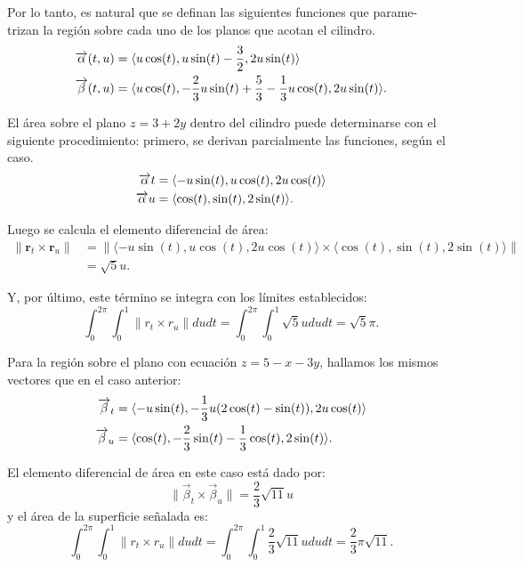 Por lo tanto, es natural que se definan las siguientes funciones que parame- \\ trizan la región sobre cada uno de los planos que acotan el cilindro.
\begin{align*}
\overrightarrow{\alpha }(t,u)&= \langle u\cos (t),u\sin (t)-\frac{3}{2},2u\sin (t)\rangle \\
\overrightarrow{\beta }(t,u)&= \langle u\cos (t),-\frac{2}{3}u\sin (t)+\frac{5}{3}-\frac{1}{3}u\cos (t),2u\sin (t)\rangle.
\end{align*}

El área sobre el plano $z=3+2y$ dentro del cilindro puede determinarse con el siguiente procedimiento: primero, se derivan parcialmente las funciones, según el caso.
\begin{align*}
\overrightarrow{\alpha }{t}&= \langle -u\sin (t),u\cos (t),2u\cos (t)\rangle  \\
\overrightarrow{\alpha }{u}&= \langle \cos (t),\sin (t),2\sin (t)\rangle.
\end{align*}

Luego se calcula el elemento diferencial de área:
\begin{align*}
\|\mathbf{r}_t \times \mathbf{r}_u\| &= \| \langle -u\sin(t), u\cos(t), 2u\cos(t) \rangle \times \langle \cos(t), \sin(t), 2\sin(t) \rangle \| \\
&= \sqrt{5}u.
\end{align*}

Y, por último, este término se integra con los límites establecidos:
\[\int_{0}^{2\pi }\int_{0}^{1}\| r_{t}\times r_{u}\|
dudt=\int_{0}^{2\pi }\int_{0}^{1}\sqrt{5}ududt= \sqrt{5}\pi.\]

Para la región sobre el plano con ecuación $z=5-x-3y$,
hallamos los mismos vectores que en el caso anterior:
\begin{align*}
\overrightarrow{\beta}_{t}&=  \langle -u\sin (t),-\frac{1}{3}u( 2\cos (t)-\sin (t))  ,2u\cos (t) \rangle  \\
\overrightarrow{\beta}_{u}&= \langle \cos (t),-\frac{2}{3}\sin (t)-\frac{1}{3}\cos (t),2\sin (t)\rangle.
\end{align*}

El elemento diferencial de área en este caso está dado por:
\[\| \overrightarrow{\beta}_{t} \times \overrightarrow{\beta}_{u} \|= \frac{2}{3}\sqrt{11}u\]
y el área de la superficie señalada es:
\[\int_{0}^{2\pi }\int_{0}^{1}\| r_{t}\times r_{u}\|
dudt=\int_{0}^{2\pi }\int_{0}^{1}\frac{2}{3}\sqrt{11}ududt= \frac{2}{3}\pi \sqrt{11}.\]

